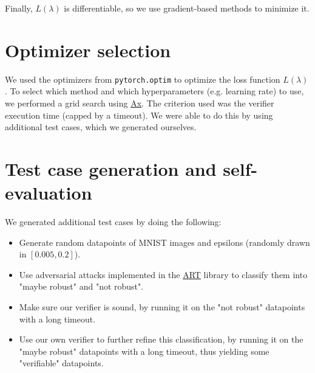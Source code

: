 \documentclass{article}
\begin{document}
Finally, $L(\lambda)$ is differentiable, so we use gradient-based methods to minimize it.

\section{Optimizer selection}

We used the optimizers from \texttt{pytorch.optim} to optimize the loss function $L(\lambda)$. 
To select which method and which hyperparameters (e.g. learning rate) to use, we performed a grid search using \href{https://github.com/facebook/Ax}{Ax}.
The criterion used was the verifier execution time (capped by a timeout).
We were able to do this by using additional test cases, which we generated ourselves.

\section{Test case generation and self-evaluation}

We generated additional test cases by doing the following:
\begin{itemize}[noitemsep]
    \item Generate random datapoints of MNIST images and epsilons (randomly drawn in $[0.005, 0.2]$).
    \item Use adversarial attacks implemented in the \href{https://github.com/IBM/adversarial-robustness-toolbox/}{ART} library to classify them into "maybe robust" and "not robust".
    \item Make sure our verifier is sound, by running it on the "not robust" datapoints with a long timeout.
    \item Use our own verifier to further refine this classification, by running it on the "maybe robust" datapoints with a long timeout, thus yielding some "verifiable" datapoints.
\end{itemize}
\end{document}
